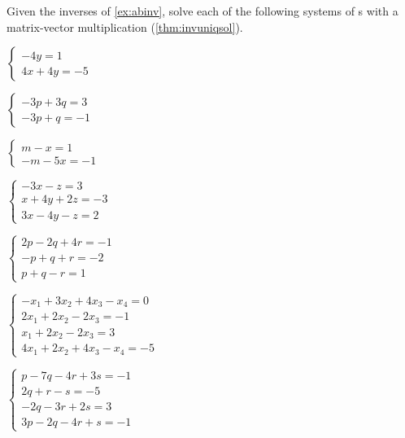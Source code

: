 \begin{exercise}  
Given the inverses of \cref{ex:abinv}, solve each of the following systems of s with a matrix-vector multiplication (\cref{thm:invuniqsol}).
\begin{Parts}
\item \(\begin{cases} -4y=1\\4x+4y=-5 \end{cases}\)

\begin{OmitV1}
\item \(\begin{cases} -3p+3q=3\\-3p+q=-1 \end{cases}\)
\end{OmitV1}

\item \(\begin{cases} m-x=1\\-m-5x=-1 \end{cases}\)

\begin{OmitV1}
\item \(\begin{cases} -3x-z=3\\ x+4y+2z=-3\\ 3x-4y-z=2 \end{cases}\)
\end{OmitV1}

\item \(\begin{cases} 2p-2q+4r=-1\\ -p+q+r=-2\\ p+q-r=1 \end{cases}\)

\item \(\begin{cases} -x_1+3x_2+4x_3-x_4=0
\\2x_1+2x_2-2x_3=-1
\\x_1+2x_2-2x_3=3
\\4x_1+2x_2+4x_3-x_4=-5 \end{cases}\)

\item \(\begin{cases} p-7q-4r+3s=-1
\\2q+r-s=-5
\\-2q-3r+2s=3
\\3p-2q-4r+s=-1 \end{cases}\)


\end{Parts}
\end{exercise}
